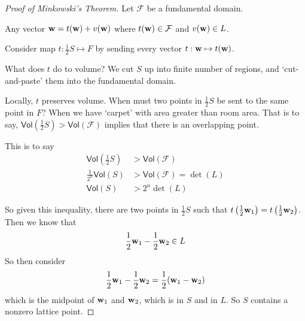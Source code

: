 \begin{proof}[Proof of Minkowski's Theorem]
    Let $\mathcal{F}$ be a fundamental domain.

    Any vector $\mathbf{w} = t(\mathbf{w}) + v(\mathbf{w})$ where $t(\mathbf{w})\in \mathcal{F}$ and $v(\mathbf{w})\in L$.

    Consider map $t: \frac{1}{2}S \mapsto F$ by sending every vector $t: \mathbf{w}\mapsto t(\mathbf{w})$.

    What does $t$ do to volume? We cut $S$ up into finite number of regions, and `cut-and-paste' them into the fundamental domain.

    Locally, $t$ preserves volume. When must two points in $\frac{1}{2}S$ be sent to the same point in $F$? When we have `carpet' with area greater than room area. That is to say, $\mathsf{Vol}(\frac{1}{2} S) > \mathsf{Vol}(\mathcal{F})$ implies that there is an overlapping point.

    This is to say
    \begin{align*}
        \mathsf{Vol}\left(\frac{1}{2} S\right) & > \mathsf{Vol}(\mathcal{F})           \\
        \frac{1}{2^n}\mathsf{Vol}(S)           & > \mathsf{Vol}(\mathcal{F}) = \det(L) \\
        \mathsf{Vol}(S)                        & > 2^n \det(L)
    \end{align*}

    So given this inequality, there are two points in $\frac{1}{2}S$ such that $t\left( \frac{1}{2}\mathbf{w}_1 \right) = t\left( \frac{1}{2}\mathbf{w}_2 \right)$. Then we know that
    \[\frac{1}{2}\mathbf{w}_1 - \frac{1}{2}\mathbf{w}_2 \in L\]
    So then consider
    \[\frac{1}{2}\mathbf{w}_1 - \frac{1}{2}\mathbf{w}_2 = \frac{1}{2}(\mathbf{w}_1 - \mathbf{w}_2)\]
    which is the midpoint of $\mathbf{w}_1$ and $\mathbf{w}_2$, which is in $S$ and in $L$. So $S$ contains a nonzero lattice point.
\end{proof}

